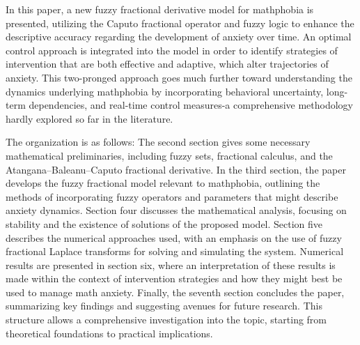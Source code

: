 \documentclass[10pt]{NSP1}
\begin{document}
\par\medskip{}\smallskip

In this paper, a new fuzzy fractional derivative model for mathphobia is presented, utilizing the Caputo fractional operator and fuzzy logic to enhance the descriptive accuracy regarding the development of anxiety over time. An optimal control approach is integrated into the model in order to identify strategies of intervention that are both effective and adaptive, which alter trajectories of anxiety. This two-pronged approach goes much further toward understanding the dynamics underlying mathphobia by incorporating behavioral uncertainty, long-term dependencies, and real-time control measures-a comprehensive methodology hardly explored so far in the literature.

The organization is as follows: The second section gives some necessary mathematical preliminaries, including fuzzy sets, fractional calculus, and the Atangana–Baleanu–Caputo fractional derivative. In the third section, the paper develops the fuzzy fractional model relevant to mathphobia, outlining the methods of incorporating fuzzy operators and parameters that might describe anxiety dynamics. Section four discusses the mathematical analysis, focusing on stability and the existence of solutions of the proposed model. Section five describes the numerical approaches used, with an emphasis on the use of fuzzy fractional Laplace transforms for solving and simulating the system. Numerical results are presented in section six, where an interpretation of these results is made within the context of intervention strategies and how they might best be used to manage math anxiety. Finally, the seventh section concludes the paper, summarizing key findings and suggesting avenues for future research. This structure allows a comprehensive investigation into the topic, starting from theoretical foundations to practical implications.

\par\medskip{}\smallskip
\end{document}
